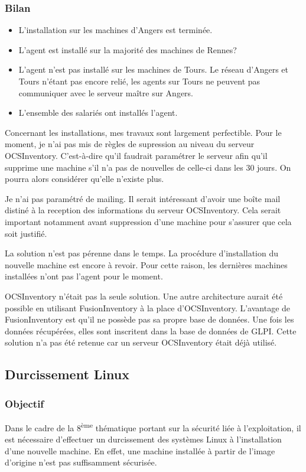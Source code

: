 \documentclass[12pt]{article}
\begin{document}
\newpage
\subsubsection{Bilan}
\begin{itemize}
    \item L'installation sur les machines d'Angers est terminée.
    \item L'agent est installé sur la majorité des machines de Rennes?
    \item L'agent n'est pas installé sur les machines de Tours. 
    Le réseau d'Angers et Tours n'étant pas encore relié, les agents sur Tours ne peuvent pas communiquer avec le serveur maître sur Angers.
    \item L'ensemble des salariés ont installés l'agent.
\end{itemize}

Concernant les installations, mes travaux sont largement perfectible.
Pour le moment, je n'ai pas mis de règles de supression au niveau du serveur \gls{OCSInventory}.
C'est-à-dire qu'il faudrait paramétrer le serveur afin qu'il supprime une machine s'il n'a pas de nouvelles de celle-ci dans les 30 jours.
On pourra alors considérer qu'elle n'existe plus.

Je n'ai pas paramétré de mailing.
Il serait intéressant d'avoir une boîte mail distiné à la reception des informations du serveur \gls{OCSInventory}.
Cela serait important notamment avant suppression d'une machine pour s'assurer que cela soit justifié.

La solution n'est pas pérenne dans le temps.
La procédure d'installation du nouvelle machine est encore à revoir.
Pour cette raison, les dernières machines installées n'ont pas l'agent pour le moment.

\gls{OCSInventory} n'était pas la seule solution.
Une autre architecture aurait été possible en utilisant FusionInventory à la place d'\gls{OCSInventory}. 
L'avantage de FusionInventory est qu'il ne possède pas sa propre base de données. 
Une fois les données récupérées, elles sont inscritent dans la base de données de \gls{GLPI}. 
Cette solution n'a pas été retenue car un serveur \gls{OCSInventory} était déjà utilisé.

\newpage
\subsection{Durcissement \gls{Linux}}
\subsubsection{Objectif}
Dans le cadre de la 8\textsuperscript{ème} thématique portant sur la sécurité liée à l'exploitation, il est nécessaire d'effectuer un durcissement des systèmes \gls{Linux} à l'installation d'une nouvelle machine. 
En effet, une machine installée à partir de l'image d'origine n'est pas suffisamment sécurisée.
\end{document}
